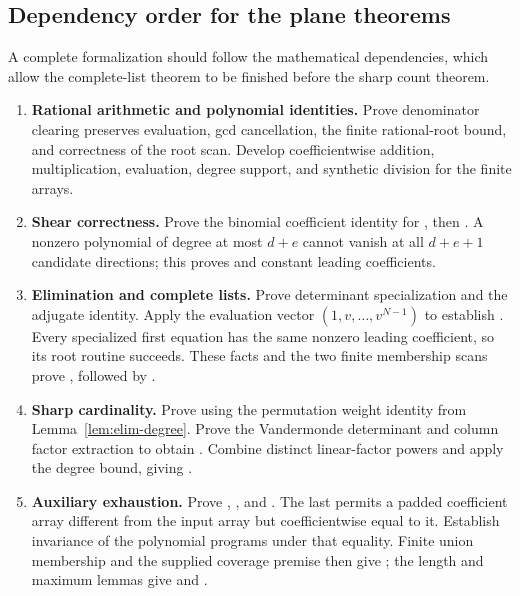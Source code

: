 \subsection{Dependency order for the plane theorems}

A complete formalization should follow the mathematical dependencies,
which allow the complete-list theorem to be finished before the sharp
count theorem.

\begin{enumerate}
\item \textbf{Rational arithmetic and polynomial identities.}
Prove denominator clearing preserves evaluation, gcd cancellation,
the finite rational-root bound, and correctness of the root scan.
Develop coefficientwise addition, multiplication, evaluation, degree
support, and synthetic division for the finite arrays.
\item \textbf{Shear correctness.}
Prove the binomial coefficient identity for , then
. A nonzero polynomial of degree at most
\(d+e\) cannot vanish at all \(d+e+1\) candidate directions; this
proves  and constant leading coefficients.
\item \textbf{Elimination and complete lists.}
Prove determinant specialization and the adjugate identity. Apply
the evaluation vector \((1,v,\ldots,v^{N-1})\) to establish
. Every specialized first equation has
the same nonzero leading coefficient, so its root routine succeeds.
These facts and the two finite membership scans prove
, followed by
.
\item \textbf{Sharp cardinality.}
Prove  using the permutation weight
identity from Lemma~\ref{lem:elim-degree}. Prove the Vandermonde
determinant and column factor extraction to obtain
. Combine distinct linear-factor
powers and apply the degree bound, giving
.
\item \textbf{Auxiliary exhaustion.}
Prove , ,
and . The last permits a padded
coefficient array different from the input array but coefficientwise
equal to it. Establish invariance of the polynomial programs under
that equality. Finite union membership and the supplied coverage
premise then give ; the length and
maximum lemmas give  and
.
\end{enumerate}

